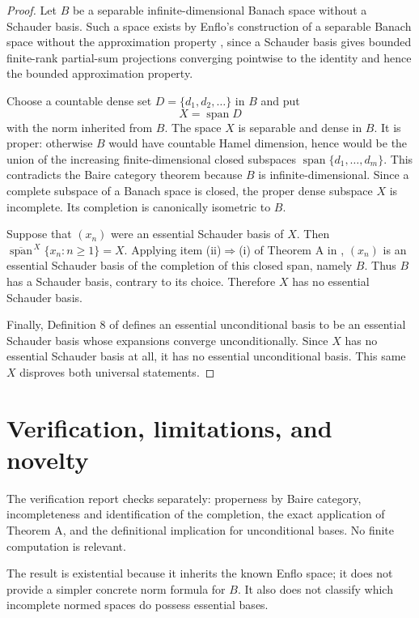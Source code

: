 \documentclass[11pt]{article}
\begin{document}
\begin{proof}
Let $B$ be a separable infinite-dimensional Banach space without a Schauder
basis. Such a space exists by Enflo's construction of a separable Banach space
without the approximation property \cite{enflo}, since a Schauder basis gives
bounded finite-rank partial-sum projections converging pointwise to the
identity and hence the bounded approximation property.

Choose a countable dense set $D=\{d_1,d_2,\ldots\}$ in $B$ and put
\[
 X=\operatorname{span}D
\]
with the norm inherited from $B$. The space $X$ is separable and dense in
$B$. It is proper: otherwise $B$ would have countable Hamel dimension, hence
would be the union of the increasing finite-dimensional closed subspaces
$\operatorname{span}\{d_1,\ldots,d_m\}$. This contradicts the Baire category
theorem because $B$ is infinite-dimensional. Since a complete subspace of a
Banach space is closed, the proper dense subspace $X$ is incomplete. Its
completion is canonically isometric to $B$.

Suppose that $(x_n)$ were an essential Schauder basis of $X$. Then
$\overline{\operatorname{span}}^{\,X}\{x_n:n\geq1\}=X$. Applying item
(ii)$\Rightarrow$(i) of
Theorem A in \cite{source}, $(x_n)$ is an essential Schauder basis of the
completion of this closed span, namely $B$. Thus $B$ has a Schauder basis,
contrary to its choice. Therefore $X$ has no essential Schauder basis.

Finally, Definition 8 of \cite{source} defines an essential unconditional
basis to be an essential Schauder basis whose expansions converge
unconditionally. Since $X$ has no essential Schauder basis at all, it has no
essential unconditional basis. This same $X$ disproves both universal
statements.
\end{proof}

\section{Verification, limitations, and novelty}

The verification report checks separately: properness by Baire category,
incompleteness and identification of the completion, the exact application of
Theorem A, and the definitional implication for unconditional bases. No
finite computation is relevant.

The result is existential because it inherits the known Enflo space; it does
not provide a simpler concrete norm formula for $B$. It also does not classify
which incomplete normed spaces do possess essential bases.
\end{document}
